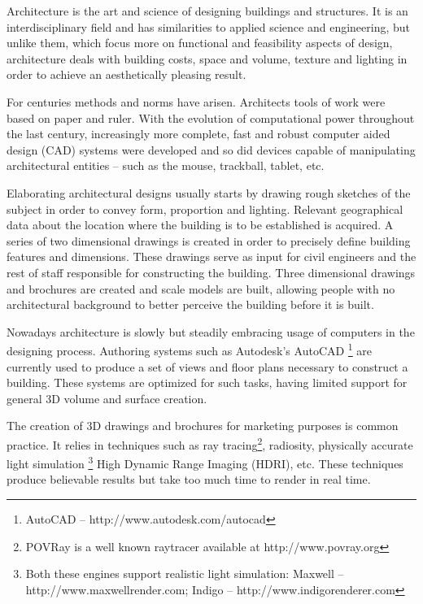 
Architecture is the art and science of designing buildings and structures.
It is an interdisciplinary field and has similarities to applied science and
engineering, but unlike them, which focus more on functional and feasibility aspects of design, 
architecture deals with building costs, space and volume, texture and lighting
in order to achieve an aesthetically pleasing result.

For centuries methods and norms have arisen. Architects tools of work were based on paper and ruler.
With the evolution of computational power throughout the last century, 
increasingly more complete, fast and robust computer aided design (CAD) systems were developed and so did
devices capable of manipulating architectural entities -- such as the mouse, trackball, tablet, etc.

Elaborating architectural designs usually starts by drawing rough sketches of the subject
in order to convey form, proportion and lighting. Relevant geographical data about the location
where the building is to be established is acquired. A series of two dimensional drawings is created
in order to precisely define building features and dimensions.
These drawings serve as input for civil engineers and the rest of staff responsible for constructing the building.
Three dimensional drawings and brochures are created and scale models are built, allowing
people with no architectural background to better perceive the building before it is built.

Nowadays architecture is slowly but steadily embracing usage of computers in the designing process.
Authoring systems such as Autodesk's AutoCAD
\footnote{AutoCAD -- http://www.autodesk.com/autocad}\nocite{SITE-AUTOCAD}
are currently used to produce a set of views and floor plans necessary to construct a building.
These systems are optimized for such tasks, having limited support for general 3D volume and surface creation.

The creation of 3D drawings and brochures for marketing purposes is common practice.
It relies in techniques such as
ray tracing\footnote{POVRay is a well known raytracer available at http://www.povray.org}\nocite{SITE-POVRAY},
radiosity,
physically accurate light simulation
\footnote{Both these engines support realistic light simulation:
Maxwell -- http://www.maxwellrender.com\nocite{SITE-MAXWELL};
Indigo -- http://www.indigorenderer.com\nocite{SITE-INDIGO}}
High Dynamic Range Imaging (HDRI), etc.
These techniques produce believable results but take too much time to render in real time.

